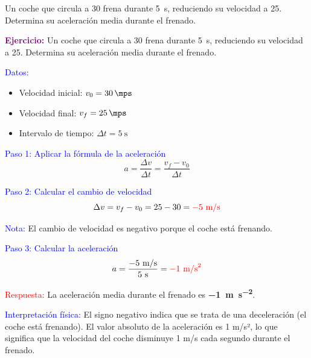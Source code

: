 \begin{exercise}
    Un coche que circula a \qty{30}{\mps} frena durante \qty{5}{\s}, reduciendo su velocidad a \qty{25}{\mps}. Determina su aceleración media durante el frenado.
    \begin{solu}
        \textbf{\textcolor{purple}{Ejercicio:}} Un coche que circula a \qty{30}{\mps} frena durante \qty{5}{\s}, reduciendo su velocidad a \qty{25}{\mps}. Determina su aceleración media durante el frenado.

        \vspace{0.3cm}

        \textcolor{blue}{Datos:}
        \begin{itemize}
            \item Velocidad inicial: $v_0 = \qty{30}{\mps}$
            \item Velocidad final: $v_f = \qty{25}{\mps}$
            \item Intervalo de tiempo: $\Delta t = \qty{5}{\s}$
        \end{itemize}

        \textcolor{blue}{Paso 1: Aplicar la fórmula de la aceleración}
        \[
            \boxed{a = \frac{\Delta v}{\Delta t} = \frac{v_f - v_0}{\Delta t}}
        \]

        \textcolor{blue}{Paso 2: Calcular el cambio de velocidad}
        \[
            \Delta v = v_f - v_0 = 25 - 30 = \textcolor{red}{-5 \text{ m/s}}
        \]

        \textcolor{blue}{Nota:} El cambio de velocidad es negativo porque el coche está frenando.

        \textcolor{blue}{Paso 3: Calcular la aceleración}
        \[
            a = \frac{-5 \text{ m/s}}{5 \text{ s}} = \textcolor{red}{-1 \text{ m/s}^2}
        \]

        \textcolor{red}{Respuesta:} La aceleración media durante el frenado es \textbf{\qty{-1}{\metre\per\second\squared}}.

        \textcolor{blue}{Interpretación física:} El signo negativo indica que se trata de una deceleración (el coche está frenando). El valor absoluto de la aceleración es 1 m/s², lo que significa que la velocidad del coche disminuye 1 m/s cada segundo durante el frenado.
    \end{solu}
\end{exercise}


